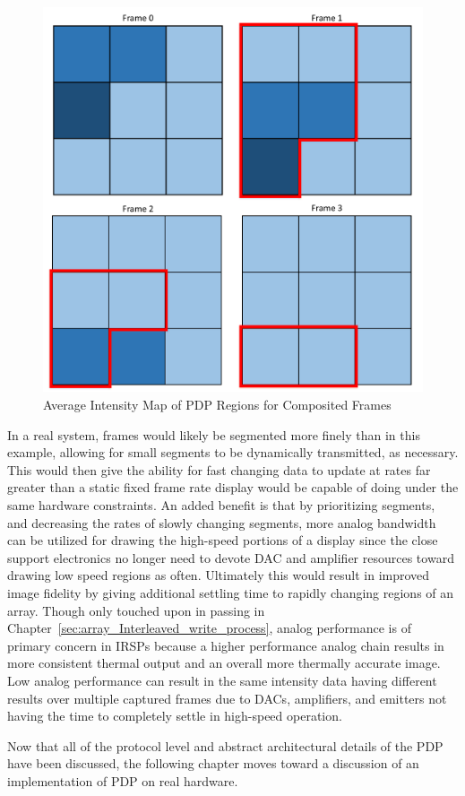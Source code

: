     \begin{figure}
        \centering
        \includegraphics[width=1.0\textwidth]{fig/frames.pdf}
        \caption{Average Intensity Map of PDP Regions for Composited Frames}
        \label{fig:intensity_map}
    \end{figure}

    In a real system, frames would likely be segmented more finely than in this example, allowing for small segments to be dynamically transmitted, as necessary. This would then give the ability for fast changing data to update at rates far greater than a static fixed frame rate display would be capable of doing under the same hardware constraints. An added benefit is that by prioritizing segments, and decreasing the rates of slowly changing segments, more analog bandwidth can be utilized for drawing the high-speed portions of a display since the close support electronics no longer need to devote DAC and amplifier resources toward drawing low speed regions as often. Ultimately this would result in improved image fidelity by giving additional settling time to rapidly changing regions of an array. Though only touched upon in passing in Chapter~\ref{sec:array_Interleaved_write_process}, analog performance is of primary concern in IRSPs because a higher performance analog chain results in more consistent thermal output and an overall more thermally accurate image. Low analog performance can result in the same intensity data having different results over multiple captured frames due to DACs, amplifiers, and emitters not having the time to completely settle in high-speed operation.

    Now that all of the protocol level and abstract architectural details of the PDP have been discussed, the following chapter moves toward a discussion of an implementation of PDP on real hardware.
